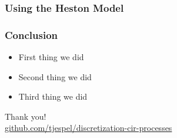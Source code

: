 \documentclass[12pt]{beamer}
\begin{document}
\begin{frame}
\frametitle{Using the Heston Model}
\end{frame}





\begin{frame}
\frametitle{Conclusion}
\begin{itemize}
  \item First thing we did
  \item Second thing we did
  \item Third thing we did
\end{itemize}
\end{frame}


\begin{frame}
\centering
{\Large Thank you!}
\\[1cm]
{\small\url{github.com/tjespel/discretization-cir-processes}}
\end{frame}
\end{document}
